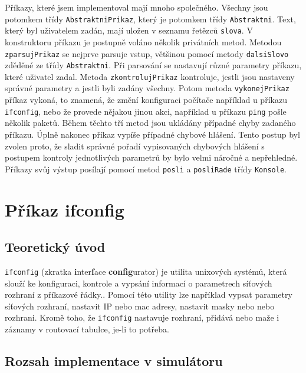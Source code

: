 Příkazy, které jsem implementoval mají mnoho společného. Všechny jsou potomkem třídy \verb|AbstraktniPrikaz|, který je potomkem třídy \verb|Abstraktni|. Text, který byl uživatelem zadán, mají uložen v seznamu řetězců \verb|slova|. V konstruktoru příkazu je postupně voláno několik privátních metod. Metodou \verb|zparsujPrikaz| se nejprve parsuje vstup, většinou pomocí metody \verb|dalsiSlovo| zděděné ze třídy \verb|Abstraktni|. Při parsování se nastavují různé parametry příkazu, které uživatel zadal. Metoda \verb|zkontrolujPrikaz| kontroluje, jestli jsou nastaveny správné parametry a jestli byli zadány všechny. Potom metoda \verb|vykonejPrikaz| příkaz vykoná, to znamená, že změní konfiguraci počítače například u příkazu \verb|ifconfig|, nebo že provede nějakou jinou akci, například u příkazu \verb|ping| pošle několik paketů. Během těchto tří metod jsou ukládány případné chyby zadaného příkazu. Úplně nakonec příkaz vypíše případné chybové hlášení. Tento postup byl zvolen proto, že sladit správné pořadí vypisovaných chybových hlášení s postupem kontroly jednotlivých parametrů by bylo velmi náročné a nepřehledné. Příkazy svůj výstup posílají pomocí metod \verb|posli| a \verb|posliRade| třídy \verb|Konsole|.




\section{Příkaz ifconfig}


\subsection{Teoretický úvod}

\verb|ifconfig| (zkratka \textbf{i}nter\textbf{f}ace \textbf{config}urator) je utilita unixových systémů, která slouží ke konfiguraci, kontrole  a vypsání informací o parametrech síťových rozhraní z příkazové řádky.\cite{wiki:ifconfig}. Pomocí této utility lze například vypsat parametry síťových rozhraní, nastavit IP nebo mac adresy, nastavit masky nebo  nebo  rozhrani. Kromě toho, že \verb|ifconfig| nastavuje rozhraní, přidává nebo maže i záznamy v routovací tabulce, je-li to potřeba.


\subsection{Rozsah implementace v simulátoru}

